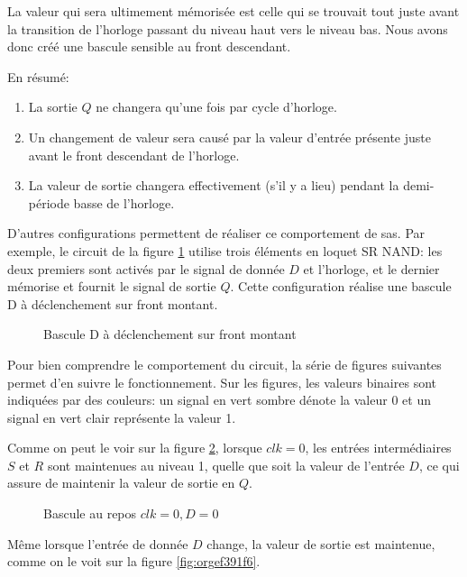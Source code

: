 \documentclass[letter, oneside]{book}
\begin{document}
\begin{enumerate}
La valeur qui sera ultimement mémorisée est celle qui se trouvait tout
juste avant la transition de l'horloge passant du niveau haut vers le
niveau bas. Nous avons donc créé une bascule sensible au front
descendant.

En résumé:
\begin{enumerate}
\item La sortie \(Q\) ne changera qu'une fois par cycle d'horloge.
\item Un changement de valeur sera causé par la valeur d'entrée présente
juste avant le front descendant de l'horloge.
\item La valeur de sortie changera effectivement (s'il y a lieu) pendant
la demi-période basse de l'horloge.
\end{enumerate}

D'autres configurations permettent de réaliser ce comportement de
sas. Par exemple, le circuit de la figure \ref{fig:org8999427} utilise
trois éléments en loquet SR NAND: les deux premiers sont activés par
le signal de donnée \(D\) et l'horloge, et le dernier mémorise et
fournit le signal de sortie \(Q\). Cette configuration réalise une
bascule D à déclenchement sur front montant.

\begin{figure}[htbp]
\centering

\caption{\label{fig:org8999427}Bascule D à déclenchement sur front montant}
\end{figure}

Pour bien comprendre le comportement du circuit, la série de figures
suivantes permet d'en suivre le fonctionnement. Sur les figures,
les valeurs binaires sont indiquées par des couleurs: un signal en
vert sombre dénote la valeur 0 et un signal en vert clair représente
la valeur 1.

Comme on peut le voir sur la figure \ref{fig:org13473a9}, lorsque \(clk = 0\), les
entrées intermédiaires \(S\) et \(R\) sont maintenues au niveau 1,
quelle que soit la valeur de l'entrée \(D\), ce qui assure de
maintenir la valeur de sortie en \(Q\).

\begin{figure}[htbp]
\centering

\caption{\label{fig:org13473a9}Bascule au repos  \(clk = 0, D=0\)}
\end{figure}

Même lorsque l'entrée de donnée \(D\) change, la valeur de sortie est
maintenue, comme on le voit sur la figure \ref{fig:orgef391f6}.


\end{enumerate}
\end{document}
